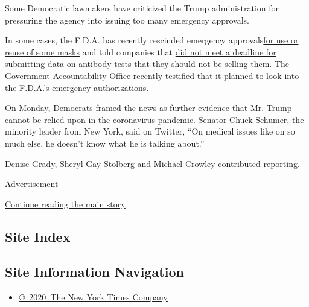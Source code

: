 Some Democratic lawmakers have criticized the Trump administration for
pressuring the agency into issuing too many emergency approvals.

In some cases, the F.D.A. has recently rescinded emergency
approvals\href{https://www.nytimes3xbfgragh.onion/2020/06/07/science/masks-china-coronavirus.html}{for
use or reuse of some masks} and told companies that
\href{https://www.nytimes3xbfgragh.onion/2020/05/04/health/fda-antibody-tests-coronavirus.html}{did
not meet a deadline for submitting data} on antibody tests that they
should not be selling them. The Government Accountability Office
recently testified that it planned to look into the F.D.A.'s emergency
authorizations.

On Monday, Democrats framed the news as further evidence that Mr. Trump
cannot be relied upon in the coronavirus pandemic. Senator Chuck
Schumer, the minority leader from New York, said on Twitter, ``On
medical issues like on so much else, he doesn't know what he is talking
about.''

Denise Grady, Sheryl Gay Stolberg and Michael Crowley contributed
reporting.

Advertisement

\protect\hyperlink{after-bottom}{Continue reading the main story}

\hypertarget{site-index}{%
\subsection{Site Index}\label{site-index}}

\hypertarget{site-information-navigation}{%
\subsection{Site Information
Navigation}\label{site-information-navigation}}

\begin{itemize}
\tightlist
\item
  \href{https://help.nytimes3xbfgragh.onion/hc/en-us/articles/115014792127-Copyright-notice}{©~2020~The
  New York Times Company}
\end{itemize}

